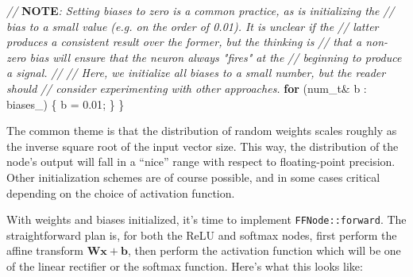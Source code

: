 \documentclass[
]{article}
\newenvironment{Shaded}{}{}
\newcommand{\AlertTok}[1]{\textcolor[rgb]{1.00,0.00,0.00}{\textbf{#1}}}
\newcommand{\CommentTok}[1]{\textcolor[rgb]{0.38,0.63,0.69}{\textit{#1}}}
\newcommand{\ControlFlowTok}[1]{\textcolor[rgb]{0.00,0.44,0.13}{\textbf{#1}}}
\newcommand{\DataTypeTok}[1]{\textcolor[rgb]{0.56,0.13,0.00}{#1}}
\newcommand{\FloatTok}[1]{\textcolor[rgb]{0.25,0.63,0.44}{#1}}
\newcommand{\NormalTok}[1]{#1}
\newcommand{\VariableTok}[1]{\textcolor[rgb]{0.10,0.09,0.49}{#1}}
\begin{document}
\begin{Shaded}
\begin{Highlighting}[]
    \CommentTok{// }\AlertTok{NOTE}\CommentTok{: Setting biases to zero is a common practice, as is initializing the}
    \CommentTok{// bias to a small value (e.g. on the order of 0.01). It is unclear if the}
    \CommentTok{// latter produces a consistent result over the former, but the thinking is}
    \CommentTok{// that a non{-}zero bias will ensure that the neuron always "fires" at the}
    \CommentTok{// beginning to produce a signal.}
    \CommentTok{//}
    \CommentTok{// Here, we initialize all biases to a small number, but the reader should}
    \CommentTok{// consider experimenting with other approaches.}
    \ControlFlowTok{for}\NormalTok{ (}\DataTypeTok{num\_t}\NormalTok{\& b : }\VariableTok{biases\_}\NormalTok{)}
\NormalTok{    \{}
\NormalTok{        b = }\FloatTok{0.01}\NormalTok{;}
\NormalTok{    \}}
\NormalTok{\}}
\end{Highlighting}
\end{Shaded}

The common theme is that the distribution of random weights scales
roughly as the inverse square root of the input vector size. This way,
the distribution of the node's output will fall in a ``nice'' range with
respect to floating-point precision. Other initialization schemes are of
course possible, and in some cases critical depending on the choice of
activation function.

With weights and biases initialized, it's time to implement
\texttt{FFNode::forward}. The straightforward plan is, for both the ReLU
and softmax nodes, first perform the affine transform
\(\mathbf{W}\mathbf{x} + \mathbf{b}\), then perform the activation
function which will be one of the linear rectifier or the softmax
function. Here's what this looks like:
\end{document}
